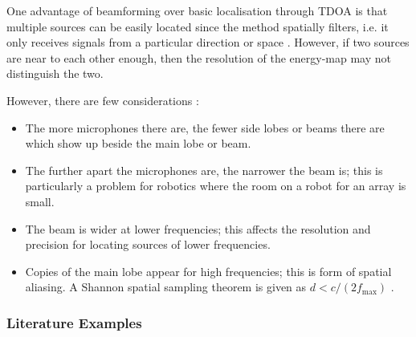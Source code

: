 \documentclass{report}
\begin{document}
One advantage of beamforming over basic localisation through TDOA is that multiple sources can be easily located since the method spatially filters, i.e. it only receives signals from a particular direction or space \cite{rascon_localization_2017}. However, if two sources are near to each other enough, then the resolution of the energy-map may not distinguish the two.

However, there are few considerations \cite{argentieri_survey_2015}:
\begin{itemize}
	\item The more microphones there are, the fewer side lobes or beams there are which show up beside the main lobe or beam.
	\item The further apart the microphones are, the narrower the beam is; this is particularly a problem for robotics where the room on a robot for an array is small.
	\item The beam is wider at lower frequencies; this affects the resolution and precision for locating sources of lower frequencies.
	\item Copies of the main lobe appear for high frequencies; this is form of spatial aliasing. A Shannon spatial sampling theorem is given as $d<c/(2f_{\text{max}})$ \cite{argentieri_survey_2015}.
\end{itemize}



\subsubsection{Literature Examples}
\end{document}
